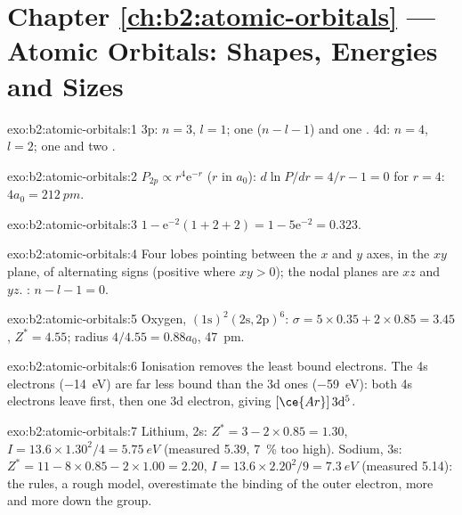 \section*{Chapter \ref{ch:b2:atomic-orbitals} --- Atomic Orbitals: Shapes, Energies and Sizes}

\begin{solution}{exo:b2:atomic-orbitals:1}
3p: $n = 3$, $l = 1$; one  ($n - l - 1$) and one . 4d: $n = 4$,
$l = 2$; one  and two .
\end{solution}

\begin{solution}{exo:b2:atomic-orbitals:2}
$P_{2p} \propto r^4\mathrm e^{-r}$ ($r$ in $a_0$): $d\ln P/dr = 4/r - 1 = 0$ for $r = 4$:
$4a_0 = \qty{212}{pm}$.
\end{solution}

\begin{solution}{exo:b2:atomic-orbitals:3}
$1 - \mathrm e^{-2}(1 + 2 + 2) = 1 - 5\mathrm e^{-2} = 0.323$.
\end{solution}

\begin{solution}{exo:b2:atomic-orbitals:4}
Four lobes pointing between the $x$ and $y$ axes, in the $xy$ plane, of alternating
signs (positive where $xy > 0$); the nodal planes are $xz$ and $yz$. :
$n - l - 1 = 0$.
\end{solution}

\begin{solution}{exo:b2:atomic-orbitals:5}
Oxygen, $(1\mathrm s)^2(2\mathrm s, 2\mathrm p)^6$: $\sigma = 5 \times 0.35 + 2 \times 0.85
= 3.45$, $Z^* = 4.55$; radius $4/4.55 = 0.88a_0$, \qty{47}{pm}.
\end{solution}

\begin{solution}{exo:b2:atomic-orbitals:6}
Ionisation removes the least bound electrons. The 4s electrons
(\qty{-14}{eV}) are far less bound than the 3d ones (\qty{-59}{eV}): both 4s
electrons leave first, then one 3d electron, giving $[\ce{Ar}]\,3\mathrm d^5$.
\end{solution}

\begin{solution}{exo:b2:atomic-orbitals:7}
Lithium, 2s: $Z^* = 3 - 2 \times 0.85 = 1.30$, $I = 13.6 \times 1.30^2/4 =
\qty{5.75}{eV}$ (measured 5.39, 7~\% too high). Sodium, 3s: $Z^* = 11 - 8 \times 0.85 -
2 \times 1.00 = 2.20$, $I = 13.6 \times 2.20^2/9 = \qty{7.3}{eV}$ (measured 5.14): the
rules, a rough model, overestimate the binding of the outer electron, more and
more down the group.
\end{solution}

